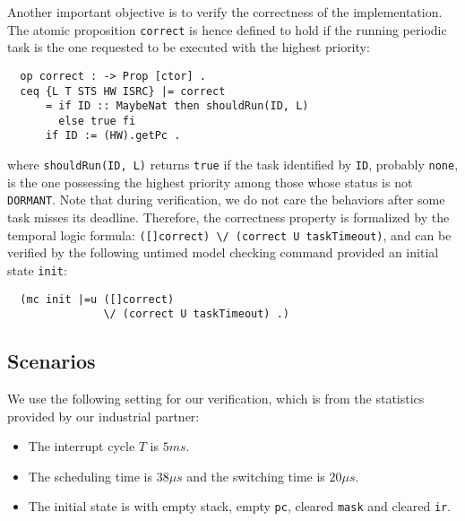 \documentclass[10pt,journal]{IEEEtran}
\newcommand{\hide}[1]{\ignorespaces}
\begin{document}
{Another important objective is to verify the correctness of the
implementation.  The atomic proposition \verb|correct| is hence
defined to hold if the running periodic task is the one requested to
be executed with the highest priority:
\begin{verbatim}
  op correct : -> Prop [ctor] .
  ceq {L T STS HW ISRC} |= correct
      = if ID :: MaybeNat then shouldRun(ID, L)
        else true fi
      if ID := (HW).getPc .
\end{verbatim}
where \verb|shouldRun(ID, L)| returns \verb|true| if the task
identified by \verb|ID|, probably \verb|none|, is the one possessing
the highest priority among those whose status is not
\verb|DORMANT|. Note that during verification, we do not care the
behaviors after some task misses its deadline. Therefore, the
correctness property is formalized by the temporal logic formula:
\verb|([]correct) \/ (correct U taskTimeout)|, and can be verified by
the following untimed model checking command provided an initial state
\verb|init|:
\begin{verbatim}
  (mc init |=u ([]correct) 
               \/ (correct U taskTimeout) .)
\end{verbatim}

\subsection{Scenarios}
\label{ss:results}
We use the following setting for our verification, which is from the 
statistics provided by our industrial partner:
\begin{itemize}
\item The interrupt cycle $T$ is $5ms$.
\item The scheduling time is $38{\mu}s$ and the switching time is
  $20{\mu}s$.  
\hide{\item The scheduling time ranges from $5{\mu}s$
  to $9{\mu}s$, and the switching time ranges from $2{\mu}s$ to
  $4{\mu}s$.}
\item The initial state is with empty stack, empty \verb|pc|, cleared 
\verb|mask| and cleared \verb|ir|.
\end{itemize}

}
\end{document}
